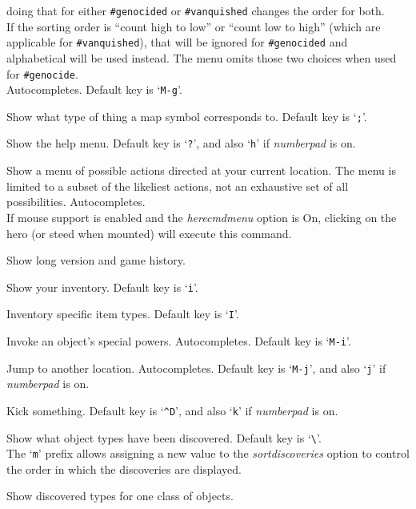 \documentclass[titlepage]{article}
\begin{document}
\begin{description}[font=\mdseries\ttfamily]
doing that for either \texttt{\#genocided} or \texttt{\#vanquished} changes the order for both.
\\
If the sorting order is ``count high to low'' or ``count low to high''
(which are applicable for \texttt{\#vanquished}), that will be ignored
for \texttt{\#genocided} and alphabetical will be used instead.
The menu omits those two choices when used for \texttt{\#genocide}.
\\
Autocompletes.
Default key is `\texttt{M-g}'.
\item[\#glance]
Show what type of thing a map symbol corresponds to. Default key is `\texttt{;}'.
\item[\#help]
Show the help menu.
Default key is `\texttt{?}',
and also `\texttt{h}' if \textit{number\textunderscore pad} is on.
\item[\#herecmdmenu]
Show a menu of possible actions directed at your current location.
The menu is limited to a subset of the likeliest actions, not an
exhaustive set of all possibilities.
Autocompletes.\\
If mouse support is enabled and the \textit{herecmd\textunderscore menu}
option is On, clicking on the hero (or steed when mounted) will
execute this command.
\item[\#history]
Show long version and game history.
\item[\#inventory]
Show your inventory. Default key is `\texttt{i}'.
\item[\#inventtype]
Inventory specific item types. Default key is `\texttt{I}'.
\item[\#invoke]
Invoke an object's special powers. Autocompletes. Default key is `\texttt{M-i}'.
\item[\#jump]
Jump to another location. Autocompletes.
Default key is `\texttt{M-j}',
and also `\texttt{j}' if \textit{number\textunderscore pad} is on.
\item[\#kick]
Kick something.
Default key is `\texttt{\textasciicircum D}',
and also `\texttt{k}' if \textit{number\textunderscore pad} is on.
\item[\#known]
Show what object types have been discovered.
Default key is `\texttt{\textbackslash}'.
\\
The `\texttt{m}' prefix allows assigning a new value to the
\textit{sortdiscoveries}
option to control the order in which the discoveries are displayed.
\item[\#knownclass]
Show discovered types for one class of objects.

\end{description}
\end{document}
